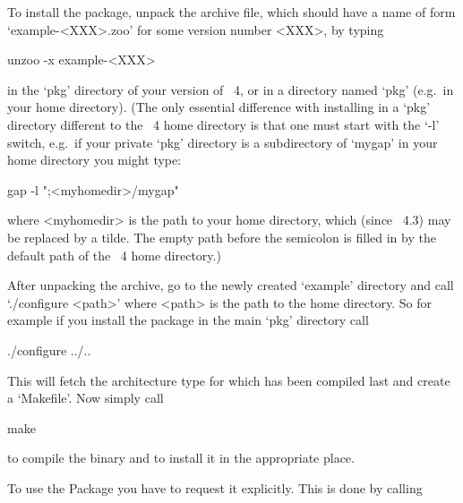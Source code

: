 


To install the {\Example} package, unpack the archive file, which  should
have a name of form `example-<XXX>.zoo' for some version number <XXX>, by
typing

unzoo -x example-<XXX>

in the `pkg' directory of your version of {\GAP}~4,  or  in  a  directory
named `pkg' (e.g.~in your home directory). (The only essential difference
with installing {\Example} in a `pkg' directory different to the {\GAP}~4
home directory is that one  must  start  {\GAP}  with  the  `-l'  switch,
e.g.~if your private `pkg' directory is a subdirectory of `mygap' in your
home directory you might type:

gap -l ";<myhomedir>/mygap"

where <myhomedir> is the  path  to  your  home  directory,  which  (since
{\GAP}~4.3) may be replaced  by  a  tilde.  The  empty  path  before  the
semicolon is  filled  in  by  the  default  path  of  the  {\GAP}~4  home
directory.)

After unpacking the archive, go to the newly created `example'  directory
and call `./configure <path>' where <path> is the path to the {\GAP} home
directory. So for example if you install the package in  the  main  `pkg'
directory call

\begintt
./configure ../..
\endtt

This will fetch the architecture type for which {\GAP} has been  compiled
last and create a `Makefile'. Now simply call

\begintt
make
\endtt

to compile the binary and to install it in the appropriate place.


To use the {\Example} Package you have to request it explicitly. This  is
done by calling

